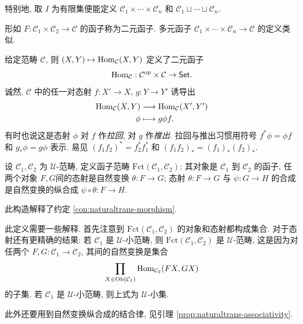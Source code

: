 特别地, 取 $I$ 为有限集便能定义 $\mathcal{C}_1 \times \cdots \times \mathcal{C}_n$ 和 $\mathcal{C}_1 \sqcup \cdots \sqcup \mathcal{C}_n$.

\begin{definition}
	形如 $F: \mathcal{C}_1 \times \mathcal{C}_2 \to \mathcal{C}$ 的函子称为二元函子. 多元函子 $\mathcal{C}_1 \times \cdots \times \mathcal{C}_n \to \mathcal{C}$ 的定义类似.
\end{definition}

\begin{example}[$\Hom$ 函子]\label{eg:Hom-functor} 
	给定范畴 $\mathcal{C}$, 则 $(X,Y) \mapsto \operatorname{Hom}_{\mathcal{C}}(X, Y)$ 定义了二元函子
	\[ \operatorname{Hom}_{\mathcal{C}}: \mathcal{C}^\text{op} \times \mathcal{C}  \to \mathsf{Set}. \]
	诚然, $\mathcal{C}$ 中的任一对态射 $f: X' \to X$, $g: Y \to Y'$ 诱导出
	\begin{align*}
		\operatorname{Hom}_{\mathcal{C}}(X, Y) & \longrightarrow \operatorname{Hom}_{\mathcal{C}}(X', Y') \\
		\phi & \longmapsto g \phi f .
	\end{align*}
	有时也说这是态射 $\phi$ 对 $f$ 作\emph{拉回}, 对 $g$ 作\emph{推出}. 拉回与推出习惯用符号 $f^* \phi = \phi f$ 和 $g_* \phi = g\phi$ 表示.
	易见 $(f_1 f_2)^* = f_2^* f_1^*$ 和 $(f_1 f_2)_* = (f_1)_* (f_2)_*$.
\end{example}

\begin{definition}[函子范畴]
	设 $\mathcal{C}_1, \mathcal{C}_2$ 为 $\mathcal{U}$-范畴, 定义函子范畴 $\text{Fct}(\mathcal{C}_1, \mathcal{C}_2)$: 其对象是 $\mathcal{C}_1$ 到 $\mathcal{C}_2$ 的函子, 任两个对象 $F, G$间的态射是自然变换 $\theta: F \to G$; 态射 $\theta: F \to G$ 与 $\psi: G \to H$ 的合成是自然变换的纵合成 $\psi \circ \theta: F \to H$.
\end{definition}
此构造解释了约定 \ref{con:naturaltrans-morphism}.

\begin{remark}
	此定义需要一些解释. 首先注意到 $\text{Fct}(\mathcal{C}_1, \mathcal{C}_2)$ 的对象和态射都构成集合. 对于态射还有更精确的结果: 若 $\mathcal{C}_1$ 是 $\mathcal{U}$-小范畴, 则 $\text{Fct}(\mathcal{C}_1, \mathcal{C}_2)$ 是 $\mathcal{U}$-范畴, 这是因为对任两个 $F, G: \mathcal{C}_1 \to \mathcal{C}_2$, 其间的自然变换是集合
	\[ \prod_{X \in \operatorname{Ob}(\mathcal{C}_1)} \operatorname{Hom}_{\mathcal{C}_2} (FX, GX) \]
	的子集. 若 $\mathcal{C}_1$ 是 $\mathcal{U}$-小范畴, 则上式为 $\mathcal{U}$-小集.

	此外还要用到自然变换纵合成的结合律, 见引理 \ref{prop:naturaltrans-associativity}.
\end{remark}

